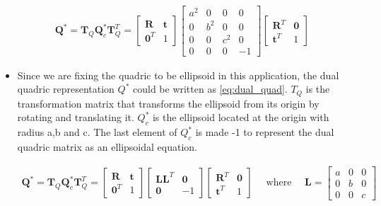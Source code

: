 \documentclass[report.tex]{subfiles}
\begin{document}
\begin{itemize}
\begin{equation}
{
\begin{aligned}
\mathbf{Q}^{*}=\mathbf{T}_{Q} \mathbf{Q}_{c}^{*} \mathbf{T}_{Q}^{T}=\left[\begin{array}{cc}
\mathbf{R} & \mathbf{t} \\
\mathbf{0}^{T} & 1
\end{array}\right]\left[\begin{array}{cccc}
a^2 & 0 & 0 & 0\\
0 & b^2 & 0 & 0\\
0 & 0 & c^2 & 0\\
0 & 0 & 0 & -1
\end{array}\right]\left[\begin{array}{cc}
\mathbf{R}^{T} & \mathbf{0} \\
\mathbf{t}^{T} & 1
\end{array}\right] \quad 
\end{aligned}
} \label{eq:dual_quad}
\end{equation}
\item Since we are fixing the quadric to be ellipsoid in this application, the dual quadric representation $Q^{*}$ could be written as  \ref{eq:dual_quad}. ${T}_{Q}$ is the transformation matrix that transforms the ellipsoid from its origin by rotating and translating it. ${Q}_{c}^{*}$ is the ellipsoid located at the origin with radius a,b and c. The last element of ${Q}_{c}^{*}$ is made -1 to represent the dual quadric matrix as an ellipsoidal equation.

\begin{equation}
{
\begin{aligned}
\mathbf{Q}^{*}=\mathbf{T}_{Q} \mathbf{Q}_{c}^{*} \mathbf{T}_{Q}^{T}=\left[\begin{array}{cc}
\mathbf{R} & \mathbf{t} \\
\mathbf{0}^{T} & 1
\end{array}\right]\left[\begin{array}{cc}
\mathbf{L L}^{T} & \mathbf{0} \\
\mathbf{0} & -1
\end{array}\right]\left[\begin{array}{cc}
\mathbf{R}^{T} & \mathbf{0} \\
\mathbf{t}^{T} & 1
\end{array}\right] \quad \text { where } \quad \mathbf{L}=\left[\begin{array}{lll}
a & 0 & 0 \\
0 & b & 0 \\
0 & 0 & c
\end{array}\right]
\end{aligned}
} \label{eq:dual_quad_upd}
\end{equation}


\end{itemize}
\end{document}
